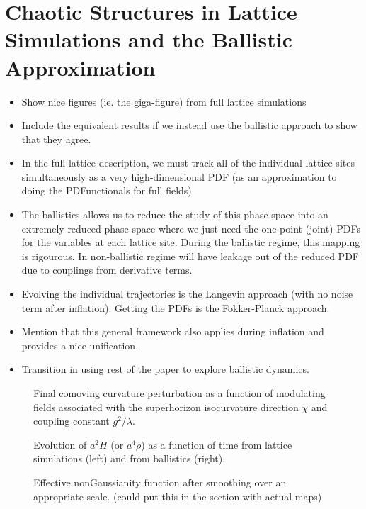 \section{Chaotic Structures in Lattice Simulations and the Ballistic Approximation}
\begin{itemize}
\item Show nice figures (ie. the giga-figure) from full lattice simulations
\item Include the equivalent results if we instead use the ballistic approach to show that they agree.
\item In the full lattice description, we must track all of the individual lattice sites simultaneously as a very high-dimensional PDF (as an approximation to doing the PDFunctionals for full fields)
\item The ballistics allows us to reduce the study of this phase space into an extremely reduced phase space where we just need the one-point (joint) PDFs for the variables at each lattice site.  During the ballistic regime, this mapping is rigourous.  In non-ballistic regime will have leakage out of the reduced PDF due to couplings from derivative terms.
\item Evolving the individual trajectories is the Langevin approach (with no noise term after inflation).  Getting the PDFs is the Fokker-Planck approach.
\item Mention that this general framework also applies during inflation and provides a nice unification.
\item Transition in using rest of the paper to explore ballistic dynamics.
\end{itemize}

\begin{figure}
  \caption{Final comoving curvature perturbation as a function of modulating fields associated with the superhorizon isocurvature direction $\chi$ and coupling constant $g^2/\lambda$.}
\end{figure}

\begin{figure}
  \caption{Evolution of $a^2H$ (or $a^4\rho$) as a function of time from lattice simulations (left) and from ballistics (right).}
\end{figure}

\begin{figure}
  \caption{Effective nonGaussianity function after smoothing over an appropriate scale. (could put this in the section with actual maps)}
\end{figure}
